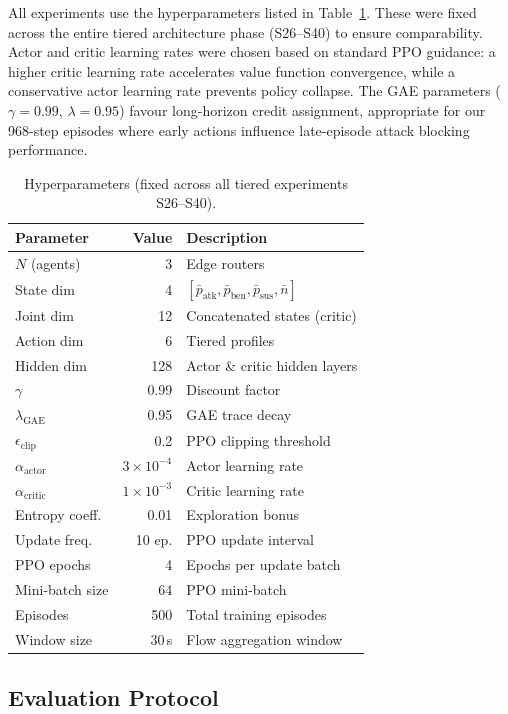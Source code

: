 \documentclass[sigconf,nonacm]{acmart}
\begin{document}
All experiments use the hyperparameters listed in Table~\ref{tab:hyperparams}. These were fixed across the entire tiered architecture phase (S26--S40) to ensure comparability. Actor and critic learning rates were chosen based on standard PPO guidance: a higher critic learning rate accelerates value function convergence, while a conservative actor learning rate prevents policy collapse. The GAE parameters ($\gamma = 0.99$, $\lambda = 0.95$) favour long-horizon credit assignment, appropriate for our 968-step episodes where early actions influence late-episode attack blocking performance.

\begin{table}[t]
\centering
\small
\caption{Hyperparameters (fixed across all tiered experiments S26--S40).}
\label{tab:hyperparams}
\begin{tabular}{lrl}
\toprule
Parameter & Value & Description \\
\midrule
$N$ (agents) & 3 & Edge routers \\
State dim & 4 & $[\bar{p}_\text{atk}, \bar{p}_\text{ben}, \bar{p}_\text{sus}, \bar{n}]$ \\
Joint dim & 12 & Concatenated states (critic) \\
Action dim & 6 & Tiered profiles \\
Hidden dim & 128 & Actor \& critic hidden layers \\
$\gamma$ & 0.99 & Discount factor \\
$\lambda_\text{GAE}$ & 0.95 & GAE trace decay \\
$\epsilon_\text{clip}$ & 0.2 & PPO clipping threshold \\
$\alpha_\text{actor}$ & $3 \times 10^{-4}$ & Actor learning rate \\
$\alpha_\text{critic}$ & $1 \times 10^{-3}$ & Critic learning rate \\
Entropy coeff. & 0.01 & Exploration bonus \\
Update freq. & 10 ep. & PPO update interval \\
PPO epochs & 4 & Epochs per update batch \\
Mini-batch size & 64 & PPO mini-batch \\
Episodes & 500 & Total training episodes \\
Window size & 30\,s & Flow aggregation window \\
\bottomrule
\end{tabular}
\end{table}

\subsection{Evaluation Protocol}
\end{document}
